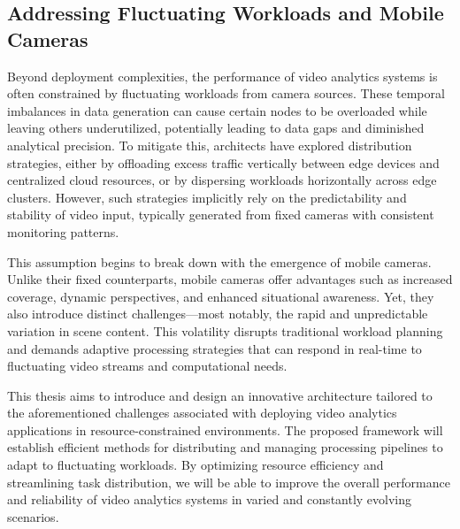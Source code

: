 \subsection{Addressing Fluctuating Workloads and Mobile Cameras}

Beyond deployment complexities, the performance of video analytics systems is often constrained by fluctuating workloads from camera sources. These temporal imbalances in data generation can cause certain nodes to be overloaded while leaving others underutilized, potentially leading to data gaps and diminished analytical precision. To mitigate this, architects have explored distribution strategies, either by offloading excess traffic vertically between edge devices and centralized cloud resources, or by dispersing workloads horizontally across edge clusters. However, such strategies implicitly rely on the predictability and stability of video input, typically generated from fixed cameras with consistent monitoring patterns.

This assumption begins to break down with the emergence of mobile cameras. Unlike their fixed counterparts, mobile cameras offer advantages such as increased coverage, dynamic perspectives, and enhanced situational awareness. Yet, they also introduce distinct challenges—most notably, the rapid and unpredictable variation in scene content. This volatility disrupts traditional workload planning and demands adaptive processing strategies that can respond in real-time to fluctuating video streams and computational needs.



This thesis aims to introduce and design an innovative architecture tailored to the aforementioned challenges associated with deploying video analytics applications in resource-constrained environments. The proposed framework will establish efficient methods for distributing and managing processing pipelines to adapt to fluctuating workloads. By optimizing resource efficiency and streamlining task distribution, we will be able to improve the overall performance and reliability of video analytics systems in varied and constantly evolving scenarios.

